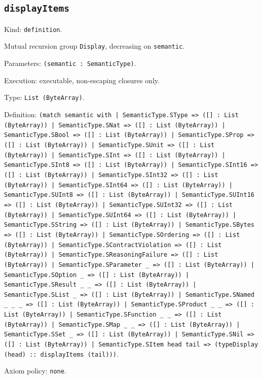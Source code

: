 \documentclass[11pt]{article}
\begin{document}
\subsection*{\texttt{displayItems}}
\noindent Kind: \texttt{definition}.\par
\noindent Mutual recursion group \texttt{Display}, decreasing on \texttt{semantic}.\par
\noindent Parameters: \texttt{(semantic : SemanticType)}.\par
\noindent Execution: executable, non-escaping closures only.\par
\noindent Type: \texttt{List (ByteArray)}.\par
\noindent Definition: \texttt{(match semantic with | SemanticType.SType => ([] : List (ByteArray)) | SemanticType.SNat => ([] : List (ByteArray)) | SemanticType.SBool => ([] : List (ByteArray)) | SemanticType.SProp => ([] : List (ByteArray)) | SemanticType.SUnit => ([] : List (ByteArray)) | SemanticType.SInt => ([] : List (ByteArray)) | SemanticType.SInt8 => ([] : List (ByteArray)) | SemanticType.SInt16 => ([] : List (ByteArray)) | SemanticType.SInt32 => ([] : List (ByteArray)) | SemanticType.SInt64 => ([] : List (ByteArray)) | SemanticType.SUInt8 => ([] : List (ByteArray)) | SemanticType.SUInt16 => ([] : List (ByteArray)) | SemanticType.SUInt32 => ([] : List (ByteArray)) | SemanticType.SUInt64 => ([] : List (ByteArray)) | SemanticType.SString => ([] : List (ByteArray)) | SemanticType.SBytes => ([] : List (ByteArray)) | SemanticType.SOrdering => ([] : List (ByteArray)) | SemanticType.SContractViolation => ([] : List (ByteArray)) | SemanticType.SReasoningFailure => ([] : List (ByteArray)) | SemanticType.SParameter \_ => ([] : List (ByteArray)) | SemanticType.SOption \_ => ([] : List (ByteArray)) | SemanticType.SResult \_ \_ => ([] : List (ByteArray)) | SemanticType.SList \_ => ([] : List (ByteArray)) | SemanticType.SNamed \_ \_ \_ => ([] : List (ByteArray)) | SemanticType.SProduct \_ \_ => ([] : List (ByteArray)) | SemanticType.SFunction \_ \_ => ([] : List (ByteArray)) | SemanticType.SMap \_ \_ => ([] : List (ByteArray)) | SemanticType.SSet \_ => ([] : List (ByteArray)) | SemanticType.SNil => ([] : List (ByteArray)) | SemanticType.SItem head tail => (typeDisplay (head) :: displayItems (tail)))}.\par
\noindent Axiom policy: \texttt{none}.\par
\end{document}
